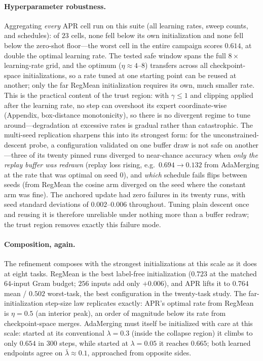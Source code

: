 \documentclass[11pt]{article}
\begin{document}
\paragraph{Hyperparameter robustness.}
Aggregating \emph{every} APR cell run on this suite (all learning rates, sweep counts, and schedules): of $23$ cells, none fell below its own initialization and none fell below the zero-shot floor---the worst cell in the entire campaign scores $0.614$, at double the optimal learning rate. The tested safe window spans the full $8\times$ learning-rate grid, and the optimum ($\eta\approx4$--$8$) transfers across all checkpoint-space initializations, so a rate tuned at one starting point can be reused at another; only the far RegMean initialization requires its own, much smaller rate. This is the practical content of the trust region: with $\gamma\le1$ and clipping applied after the learning rate, no step can overshoot its expert coordinate-wise (Appendix, box-distance monotonicity), so there is no divergent regime to tune around---degradation at excessive rates is gradual rather than catastrophic. The multi-seed replication sharpens this into its strongest form: for the unconstrained-descent probe, a configuration validated on one buffer draw is not safe on another---three of its twenty pinned runs diverged to near-chance accuracy when \emph{only the replay buffer was redrawn} (replay loss rising, e.g.\ $0.694\!\to\!0.132$ from AdaMerging at the rate that was optimal on seed $0$), and \emph{which} schedule fails flips between seeds (from RegMean the cosine arm diverged on the seed where the constant arm was fine). The anchored update had zero failures in its twenty runs, with seed standard deviations of $0.002$--$0.006$ throughout. Tuning plain descent once and reusing it is therefore unreliable under nothing more than a buffer redraw; the trust region removes exactly this failure mode.

\paragraph{Composition, again.}
The refinement composes with the strongest initializations at this scale as it does at eight tasks. RegMean is the best label-free initialization ($0.723$ at the matched $64$-input Gram budget; $256$ inputs add only $+0.006$), and APR lifts it to $0.764$ mean / $0.502$ worst-task, the best configuration in the twenty-task study. The far-initialization step-size law replicates exactly: APR's optimal rate from RegMean is $\eta=0.5$ (an interior peak), an order of magnitude below its rate from checkpoint-space merges. AdaMerging must itself be initialized with care at this scale: started at its conventional $\lambda=0.3$ (inside the collapse region) it climbs to only $0.654$ in $300$ steps, while started at $\lambda=0.05$ it reaches $0.665$; both learned endpoints agree on $\bar\lambda\approx0.1$, approached from opposite sides.
\end{document}
